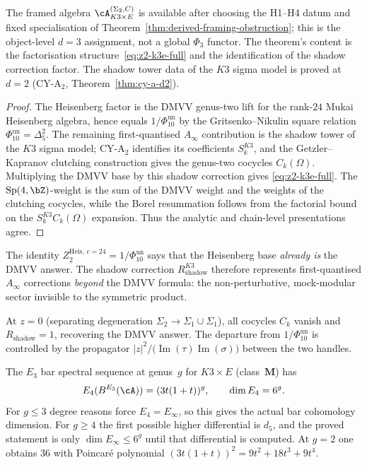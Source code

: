\begin{theorem}
The framed algebra $\cA_{K3 \times E}^{(\Sigma_2,C)}$ is available after
choosing the H1--H4 datum and fixed specialisation of
Theorem~\ref{thm:derived-framing-obstruction}; this is the
object-level $d=3$ assignment, not a global $\Phi_3$ functor.
The theorem's content is the factorisation
structure~\eqref{eq:z2-k3e-full} and the identification of the
shadow correction factor. The shadow tower data of the
$K3$ sigma model is proved at $d = 2$
\textup{(}CY-A$_2$, Theorem~\ref{thm:cy-a-d2}\textup{)}.
\end{theorem}

\begin{proof}
The Heisenberg factor is the DMVV genus-two lift for the rank-\(24\)
Mukai Heisenberg algebra, hence equals \(1/\Phi_{10}^{\mathrm{un}}\) by the
Gritsenko--Nikulin square relation \(\Phi_{10}^{\mathrm{un}}=\Delta_5^2\). The
remaining first-quantised \(A_\infty\) contribution is the shadow tower
of the \(K3\) sigma model; CY-A$_2$ identifies its coefficients
\(S_k^{K3}\), and the Getzler--Kapranov clutching construction gives the
genus-two cocycles \(C_k(\Omega)\). Multiplying the DMVV base by this
shadow correction gives \eqref{eq:z2-k3e-full}. The
\(\mathrm{Sp}(4,\bZ)\)-weight is the sum of the DMVV weight and the
weights of the clutching cocycles, while the Borel resummation follows
from the factorial bound on the \(S_k^{K3}C_k(\Omega)\) expansion.
Thus the analytic and chain-level presentations agree.
\end{proof}

\begin{remark}
\label{rem:shadow-siegel-bridge-g2}
The identity \(Z_2^{\mathrm{Heis},\, c=24} = 1/\Phi_{10}^{\mathrm{un}}\) says that
the Heisenberg base \emph{already is} the DMVV answer.
The shadow correction $R_{\mathrm{shadow}}^{K3}$ therefore represents
first-quantised $A_\infty$ corrections \emph{beyond} the DMVV formula:
the non-perturbative, mock-modular sector invisible to the symmetric
product.

At $z = 0$ \textup{(}separating degeneration $\Sigma_2 \to
\Sigma_1 \cup \Sigma_1$\textup{)}, all cocycles $C_k$ vanish and
$R_{\mathrm{shadow}} = 1$, recovering the DMVV answer.
The departure from \(1/\Phi_{10}^{\mathrm{un}}\) is controlled by the propagator
$|z|^2/\bigl(\operatorname{Im}(\tau)\operatorname{Im}(\sigma)\bigr)$
between the two handles.

The $E_3$ bar spectral sequence at genus~$g$ for $K3 \times E$
\textup{(}class~$\mathbf M$\textup{)} has
\[
 E_4(B^{E_3}(\cA))=(3t(1+t))^g,\qquad \dim E_4=6^g.
\]
For $g\leq3$ degree reasons force $E_4=E_\infty$, so this gives the
actual bar cohomology dimension. For $g\geq4$ the first possible higher
differential is $d_5$, and the proved statement is only
$\dim E_\infty\leq6^g$ until that differential is computed. At $g=2$
one obtains $36$ with Poincar\'e polynomial
$(3t(1+t))^2 = 9t^2 + 18t^3 + 9t^4$.
\end{remark}

